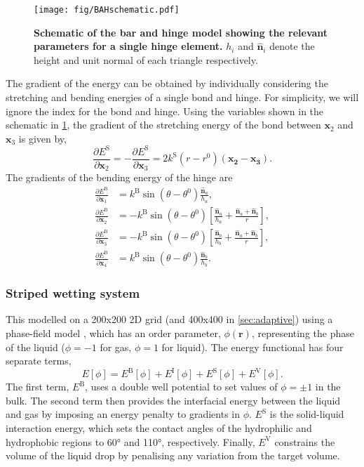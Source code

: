 \documentclass[twocolumn,10pt]{revtex4}
\newcommand{\bm}[1]{\boldsymbol{\mathbf{#1}}}
\begin{document}
\begin{figure}[htb]
  \texttt{[image: fig/BAHschematic.pdf]}
  \caption{\label{fig:BAHschematic}
    \textbf{Schematic of the bar and hinge model showing the relevant parameters for a single hinge element.}
    $h_i$ and $\bm{\hat{n}}_i$ denote the height and unit normal of each triangle respectively.
  }
\end{figure}
The gradient of the energy can be obtained by individually considering the stretching and bending energies of a single bond and hinge.
For simplicity, we will ignore the index for the bond and hinge.
Using the variables shown in the schematic in \cref{fig:BAHschematic}, the gradient of the stretching energy of the bond between $\bm{x}_2$ and $\bm{x}_3$ is given by,
\begin{equation}
  \frac{\partial E^\mathrm{S}}{\partial \bm{x}_2} = - \frac{\partial E^\mathrm{S}}{\partial \bm{x}_3} =
    2 k^\mathrm{S} (r - r^0) (\bm{x_2} - \bm{x_3}).
\end{equation}
The gradients of the bending energy of the hinge are
\begin{align}
  \frac{\partial E^\mathrm{B}}{\partial \bm{x}_1} &= k^\mathrm{B} \sin(\theta - \theta^0) \frac{\bm{\hat{n}}_a}{h_a}, \\
  \frac{\partial E^\mathrm{B}}{\partial \bm{x}_2} &= - k^\mathrm{B} \sin(\theta - \theta^0) \left[\frac{\bm{\hat{n}}_a}{h_a} + \frac{\bm{\hat{n}}_a + \bm{\hat{n}}_b}{r}\right], \\
  \frac{\partial E^\mathrm{B}}{\partial \bm{x}_3} &= - k^\mathrm{B} \sin(\theta - \theta^0) \left[\frac{\bm{\hat{n}}_b}{h_b} + \frac{\bm{\hat{n}}_a + \bm{\hat{n}}_b}{r}\right], \\
  \frac{\partial E^\mathrm{B}}{\partial \bm{x}_4} &= k^\mathrm{B} \sin(\theta - \theta^0) \frac{\bm{\hat{n}}_b}{h_b}.
\end{align}

\subsubsection{Striped wetting system}
This modelled on a 200x200 2D grid (and 400x400 in \cref{sec:adaptive}) using a phase-field model \cite{Panter2019b}, which has an order parameter, $\phi(\bm{r})$, representing the phase of the liquid ($\phi=-1$ for gas, $\phi=1$ for liquid).
The energy functional has four separate terms,
\begin{equation} \label{eq:phasefield}
  E[\phi] = E^\mathrm{B}[\phi] + E^\mathrm{I}[\phi] + E^\mathrm{S}[\phi] + E^\mathrm{V}[\phi].
\end{equation}
The first term, $E^\mathrm{B}$, uses a double well potential to set values of $\phi=\pm1$ in the bulk.
The second term then provides the interfacial energy between the liquid and gas by imposing an energy penalty to gradients in $\phi$.
$E^\mathrm{S}$ is the solid-liquid interaction energy, which sets the contact angles of the hydrophilic and hydrophobic regions to 60\si{\degree} and 110\si{\degree}, respectively.
Finally, $E^\mathrm{V}$ constrains the volume of the liquid drop by penalising any variation from the target volume.
\end{document}

